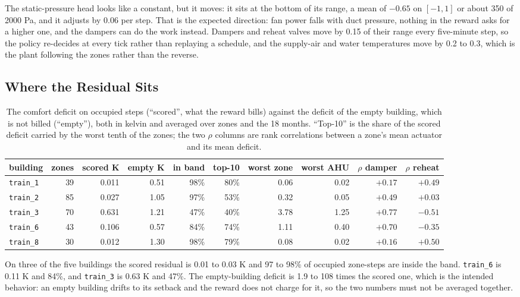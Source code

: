 \documentclass{article}
\begin{document}
The static-pressure head looks like a constant, but it moves: it sits at the bottom of its range, a mean of $-0.65$ on $[-1,1]$ or about 350 of 2000 Pa, and it adjusts by 0.06 per step. That is the expected direction: fan power falls with duct pressure, nothing in the reward asks for a higher one, and the dampers can do the work instead. Dampers and reheat valves move by 0.15 of their range every five-minute step, so the policy re-decides at every tick rather than replaying a schedule, and the supply-air and water temperatures move by 0.2 to 0.3, which is the plant following the zones rather than the reverse.

\subsection{Where the Residual Sits}

\begin{table}[h!]
\centering
\small
\setlength{\tabcolsep}{3.4pt}
\begin{tabular}{@{}lrrrrrrrrr@{}}
\toprule
building & zones & scored K & empty K & in band & top-10 & worst zone & worst AHU & $\rho$ damper & $\rho$ reheat \\
\midrule
\texttt{train\_1} & 39 & 0.011 & 0.51 & 98\% & 80\% & 0.06 & 0.02 & $+0.17$ & $+0.49$ \\
\texttt{train\_2} & 85 & 0.027 & 1.05 & 97\% & 53\% & 0.32 & 0.05 & $+0.49$ & $+0.03$ \\
\texttt{train\_3} & 70 & 0.631 & 1.21 & 47\% & 40\% & 3.78 & 1.25 & $+0.77$ & $-0.51$ \\
\texttt{train\_6} & 43 & 0.106 & 0.57 & 84\% & 74\% & 1.11 & 0.40 & $+0.70$ & $-0.35$ \\
\texttt{train\_8} & 30 & 0.012 & 1.30 & 98\% & 79\% & 0.08 & 0.02 & $+0.16$ & $+0.50$ \\
\bottomrule
\end{tabular}
\vspace{4pt}
\caption{The comfort deficit on occupied steps (``scored'', what the reward bills) against the deficit of the empty building, which is not billed (``empty''), both in kelvin and averaged over zones and the 18 months. ``Top-10'' is the share of the scored deficit carried by the worst tenth of the zones; the two $\rho$ columns are rank correlations between a zone's mean actuator and its mean deficit.}
\label{tab:app_zones}
\end{table}

On three of the five buildings the scored residual is 0.01 to 0.03 K and 97 to 98\% of occupied zone-steps are inside the band. \texttt{train\_6} is 0.11 K and 84\%, and \texttt{train\_3} is 0.63 K and 47\%. The empty-building deficit is 1.9 to 108 times the scored one, which is the intended behavior: an empty building drifts to its setback and the reward does not charge for it, so the two numbers must not be averaged together.
\end{document}
